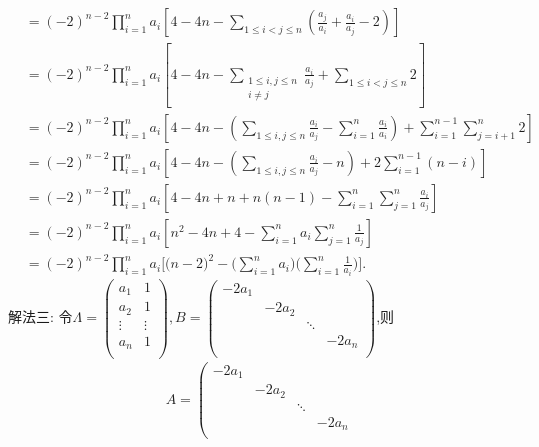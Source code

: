 \documentclass[lang=cn,newtx,10pt,scheme=chinese]{elegantbook}
\begin{document}
\begin{solution}
\begin{align*}
\\
&=\left( -2 \right) ^{n-2}\prod_{i=1}^n{a_i}\left[ 4-4n-\sum_{1\leqslant i<j\leqslant n}{\left( \frac{a_j}{a_i}+\frac{a_i}{a_j}-2 \right)} \right] 
\\
&=\left( -2 \right) ^{n-2}\prod_{i=1}^n{a_i}\left[ 4-4n-\sum_{\substack{
	1\leqslant i,j\leqslant n\\
	i\ne j\\
}}{\frac{a_i}{a_j}}+\sum_{1\leqslant i<j\leqslant n}{2} \right] 
\\
&=\left( -2 \right) ^{n-2}\prod_{i=1}^n{a_i}\left[ 4-4n-\left( \sum_{1\leqslant i,j\leqslant n}{\frac{a_i}{a_j}}-\sum_{i=1}^n{\frac{a_i}{a_i}} \right) +\sum_{i=1}^{n-1}{\sum_{j=i+1}^n{2}} \right] 
\\
&=\left( -2 \right) ^{n-2}\prod_{i=1}^n{a_i}\left[ 4-4n-\left( \sum_{1\leqslant i,j\leqslant n}{\frac{a_i}{a_j}}-n \right) +2\sum_{i=1}^{n-1}{\left( n-i \right)} \right] 
\\
&=\left( -2 \right) ^{n-2}\prod_{i=1}^n{a_i}\left[ 4-4n+n+n\left( n-1 \right) -\sum_{i=1}^n{\sum_{j=1}^n{\frac{a_i}{a_j}}} \right] 
\\
&=\left( -2 \right) ^{n-2}\prod_{i=1}^n{a_i}\left[ n^2-4n+4-\sum_{i=1}^n{a_i\sum_{j=1}^n{\frac{1}{a_j}}} \right] 
\\
&=\left( -2 \right) ^{n-2}\prod_{i=1}^n{a_i[(n}-2)^2-(\sum_{i=1}^n{a_i)(\sum_{i=1}^n{\frac{1}{a_i})]}}.
    \end{align*}
{\color{blue}解法三:}
令$\varLambda=\left( \begin{matrix}
	a_1&		1\\
	a_2&		1\\
	\vdots&		\vdots\\
	a_n&		1\\
\end{matrix} \right) ,B=\left( \begin{matrix}
	-2a_1&		&		&		\\
	&		-2a_2&		&		\\
	&		&		\ddots&		\\
	&		&		&		-2a_n\\
\end{matrix} \right) $,则
\begin{align*}
    A=\left( \begin{matrix}
        -2a_1&		&		&		\\
        &		-2a_2&		&		\\
        &		&		\ddots&		\\
        &		&		&		-2a_n\\

\end{matrix}
\end{align*}
\end{solution}
\end{document}
